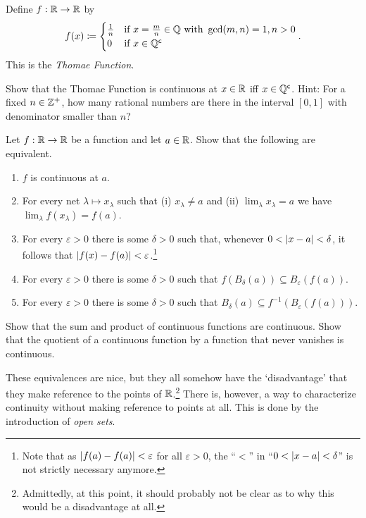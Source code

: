 \begin{exm}
Define $f:\mathbb{R} \rightarrow \mathbb{R}$ by
\begin{equation}
f(x)\coloneqq \begin{cases}\tfrac{1}{n} & \text{if }x=\tfrac{m}{n}\in \mathbb{Q} \text{ with }\gcd (m,n)=1,n>0 \\ 0 & \text{if }x\in \mathbb{Q} ^{\mathsf{c}}\end{cases}.
\end{equation}
This is the \emph{Thomae Function}.
\begin{exr}
Show that the Thomae Function is continuous at $x\in \mathbb{R}$ iff $x\in \mathbb{Q} ^{\mathsf{c}}$.  Hint:  For a fixed $n\in \mathbb{Z} ^+$, how many rational numbers are there in the interval $[0,1]$ with denominator smaller than $n$?
\end{exr}
\end{exm}
\begin{exr}\label{exr3.4.5}
Let $f:\mathbb{R} \rightarrow \mathbb{R}$ be a function and let $a\in \mathbb{R}$.  Show that the following are equivalent.
\begin{enumerate}
\item \label{enm3.4.5.i}$f$ is continuous at $a$.
\item \label{enm3.4.5.ii}For every net $\lambda \mapsto x_\lambda$ such that (i) $x_\lambda \neq a$ and (ii) $\lim _\lambda x_\lambda =a$ we have $\lim _\lambda f(x_\lambda )=f(a)$.
\item \label{enm3.4.5.iii}For every $\varepsilon >0$ there is some $\delta >0$ such that, whenever $0<\lvert x-a\rvert<\delta$, it follows that $\lvert f(x)-f(a)\rvert<\varepsilon$.\footnote{Note that as $\lvert f(a)-f(a)\rvert<\varepsilon$ for all $\varepsilon >0$, the ``$<$'' in ``$0<\lvert x-a\rvert<\delta$'' is not strictly necessary anymore.}
\item \label{enm3.4.5.iv}For every $\varepsilon >0$ there is some $\delta >0$ such that $f(B_\delta (a))\subseteq B_\varepsilon (f(a))$.
\item \label{enm3.4.5.v}For every $\varepsilon >0$ there is some $\delta >0$ such that $B_\delta (a)\subseteq f^{-1}(B_\varepsilon (f(a)))$.
\end{enumerate}
\end{exr}
\begin{exr}\label{exr3.4.12}
Show that the sum and product of continuous functions are continuous.  Show that the quotient of a continuous function by a function that never vanishes is continuous.
\end{exr}
These equivalences are nice, but they all somehow have the `disadvantage' that they make reference to the points of $\mathbb{R}$.\footnote{Admittedly, at this point, it should probably not be clear as to why this would be a disadvantage at all.}  There is, however, a way to characterize continuity without making reference to points at all.  This is done by the introduction of \emph{open sets}.

